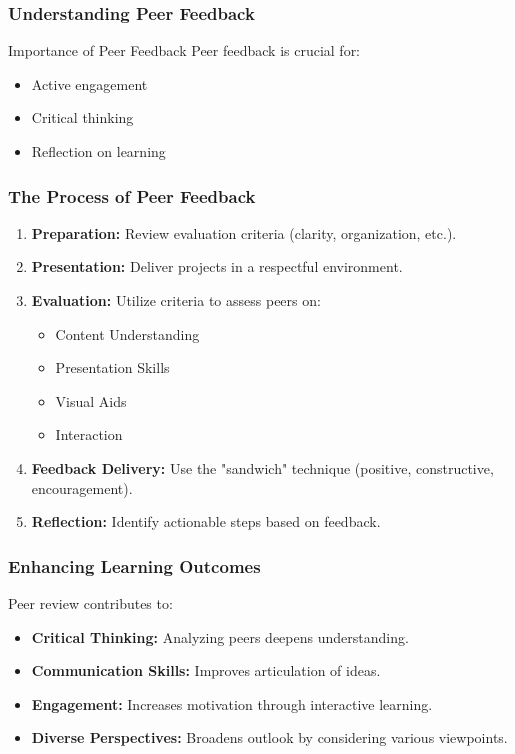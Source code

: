 \documentclass[aspectratio=169]{beamer}
\begin{document}
\begin{frame}[fragile]
    \frametitle{Understanding Peer Feedback}
    \begin{block}{Importance of Peer Feedback}
        Peer feedback is crucial for:
        \begin{itemize}
            \item Active engagement 
            \item Critical thinking
            \item Reflection on learning
        \end{itemize}
    \end{block}
\end{frame}

\begin{frame}[fragile]
    \frametitle{The Process of Peer Feedback}
    \begin{enumerate}
        \item \textbf{Preparation:} Review evaluation criteria (clarity, organization, etc.).
        \item \textbf{Presentation:} Deliver projects in a respectful environment.
        \item \textbf{Evaluation:} Utilize criteria to assess peers on:
            \begin{itemize}
                \item Content Understanding
                \item Presentation Skills
                \item Visual Aids
                \item Interaction
            \end{itemize}
        \item \textbf{Feedback Delivery:} Use the "sandwich" technique (positive, constructive, encouragement).
        \item \textbf{Reflection:} Identify actionable steps based on feedback.
    \end{enumerate}
\end{frame}

\begin{frame}[fragile]
    \frametitle{Enhancing Learning Outcomes}
    Peer review contributes to:
    \begin{itemize}
        \item \textbf{Critical Thinking:} Analyzing peers deepens understanding.
        \item \textbf{Communication Skills:} Improves articulation of ideas.
        \item \textbf{Engagement:} Increases motivation through interactive learning.
        \item \textbf{Diverse Perspectives:} Broadens outlook by considering various viewpoints.
    \end{itemize}
\end{frame}
\end{document}
